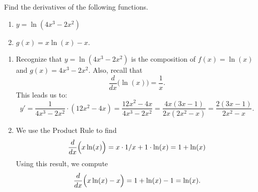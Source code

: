 
\begin{example} \label{Ex:2.8.Eg1}
Find the derivatives of the following functions. 

			\begin{enumerate}[1)]
			\item		$y = \ln (4x^3-2x^2)$
			\item		$g(x) = x\ln(x) - x$.
			\end{enumerate}

\solution
\begin{enumerate}[1)]
\item Recognize that $y = \ln (4x^3-2x^2)$ is the composition of $f(x) = \ln(x)$ and $g(x) = 4x^3-2x^2$. Also, recall that $$\frac{d}{dx}\Big(\ln(x)\Big) = \frac{1}{x}.$$ This leads us to:
		$$y' = \frac{1}{4x^3-2x^2} \cdot (12x^2-4x) = \frac{12x^2-4x}{4x^3-2x^2}= \frac{4x(3x-1)}{2x(2x^2-x)} = \frac{2(3x-1)}{2x^2-x}.$$
\item We use the Product Rule to find $$\displaystyle \frac{d}{dx}\Big(x\ln(x)\Big) = x\cdot 1/x + 1\cdot \ln(x) = 1+\ln(x)$$ Using this result, we compute $$\displaystyle \frac{d}{dx}\Big(x\ln(x)-x\Big) = 1+\ln(x)-1 = \ln(x).$$ 
		\end{enumerate}

\end{example}